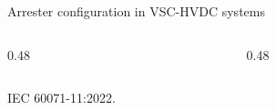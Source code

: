 \begin{frame}{Arrester configuration in VSC-HVDC systems}
  \begin{columns}[c,onlytextwidth]
    \begin{column}{0.48\textwidth}
      \centering
    \end{column}
    \begin{column}{0.48\textwidth}
      \centering
    \end{column}
  \end{columns}
  \vspace{0.3em}
  \centering
  {\color{atGray}\footnotesize IEC 60071-11:2022.}
\end{frame}
